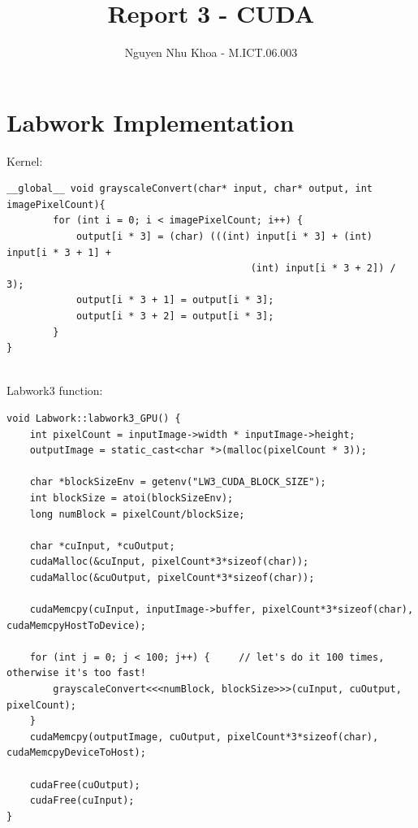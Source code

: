 \documentclass[a4paper,11pt, notitlepage]{article}
\begin{document}
\title{
\vspace{-3cm}
Report 3 - CUDA}
\author{Nguyen Nhu Khoa - M.ICT.06.003}
\maketitle

\pagestyle{plain}
\setcounter{page}{1}

\vspace{-1cm}
\noindent

\section{Labwork Implementation}

Kernel:
\begin{flushleft}
\small
\begin{BVerbatim}
__global__ void grayscaleConvert(char* input, char* output, int imagePixelCount){
        for (int i = 0; i < imagePixelCount; i++) {
            output[i * 3] = (char) (((int) input[i * 3] + (int) input[i * 3 + 1] +
                                          (int) input[i * 3 + 2]) / 3);
            output[i * 3 + 1] = output[i * 3];
            output[i * 3 + 2] = output[i * 3];
        }
}
\end{BVerbatim}
\end{flushleft}
~\\
Labwork3 function:
\begin{flushleft}
\small
\begin{BVerbatim}
void Labwork::labwork3_GPU() {
    int pixelCount = inputImage->width * inputImage->height;
    outputImage = static_cast<char *>(malloc(pixelCount * 3)); 

    char *blockSizeEnv = getenv("LW3_CUDA_BLOCK_SIZE");
    int blockSize = atoi(blockSizeEnv);
    long numBlock = pixelCount/blockSize;

    char *cuInput, *cuOutput;
    cudaMalloc(&cuInput, pixelCount*3*sizeof(char));
    cudaMalloc(&cuOutput, pixelCount*3*sizeof(char));
    
    cudaMemcpy(cuInput, inputImage->buffer, pixelCount*3*sizeof(char), cudaMemcpyHostToDevice);
    
    for (int j = 0; j < 100; j++) {     // let's do it 100 times, otherwise it's too fast!
    	grayscaleConvert<<<numBlock, blockSize>>>(cuInput, cuOutput, pixelCount);
    }
    cudaMemcpy(outputImage, cuOutput, pixelCount*3*sizeof(char), cudaMemcpyDeviceToHost);
    
    cudaFree(cuOutput);
    cudaFree(cuInput);
}
\end{BVerbatim}
\end{flushleft}
\end{document}
